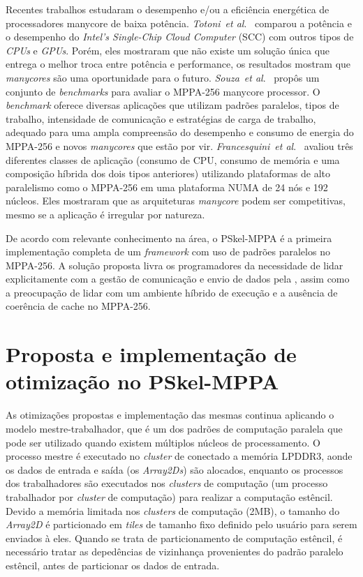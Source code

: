 \documentclass[a4paper,11pt]{article}
\newcommand{\etal}{\textit{et al}.\xspace}
\newcommand{\pskelmppa}{PSkel-MPPA\xspace}
\newcommand{\mppa}{MPPA-256\xspace}
\newcommand{\fw}{\textit{framework}\xspace}
\begin{document}
Recentes trabalhos estudaram o desempenho e/ou a eficiência energética de processadores manycore de baixa potência. \emph{Totoni}~\etal~\cite{SCCEnergy:2012} comparou a potência e o desempenho do \emph{Intel's Single-Chip Cloud Computer} (SCC) com outros tipos de \emph{CPUs} e \emph{GPUs}. Porém, eles mostraram que não existe um solução única que entrega o melhor troca entre potência e performance, os resultados mostram que \emph{manycores} são uma oportunidade para o futuro. \emph{Souza}~\etal~\cite{Castro-Souza-CCPE:2016} propôs um conjunto de \emph{benchmarks} para avaliar o \mppa manycore processor. O \emph{benchmark} oferece diversas aplicações que utilizam padrões paralelos, tipos de trabalho, intensidade de comunicação e estratégias de carga de trabalho, adequado para uma ampla compreensão do desempenho e consumo de energia do \mppa e novos \emph{manycores} que estão por vir. \emph{Francesquini}~\etal~\cite{Castro-IA3-JPDC:2014} avaliou três diferentes classes de aplicação (consumo de CPU, consumo de memória e uma composição híbrida dos dois tipos anteriores) utilizando plataformas de alto paralelismo como o \mppa em uma plataforma NUMA de 24 nós e 192 núcleos. Eles mostraram que as arquiteturas \emph{manycore} podem ser competitivas, mesmo se a aplicação é irregular por natureza.

De acordo com relevante conhecimento na área, o \pskelmppa é a primeira implementação completa de um \fw com uso de padrões paralelos no \mppa. A solução proposta livra os programadores da necessidade de lidar explicitamente com a gestão de comunicação e envio de dados pela \noc, assim como a preocupação de lidar com um ambiente híbrido de execução e a ausência de coerência de cache no \mppa.

\section{Proposta e implementação de otimização no PSkel-MPPA}
\label{sec:pskelMPPA}

As otimizações propostas e implementação das mesmas continua aplicando o modelo mestre-trabalhador, que é um dos padrões de computação paralela que pode ser utilizado quando existem múltiplos núcleos de processamento. O processo mestre é executado no \emph{cluster} de \io conectado a memória LPDDR3, aonde os dados de entrada e saída (os \emph{Array2Ds}) são alocados, enquanto os processos dos trabalhadores são executados nos \emph{clusters} de computação (um processo trabalhador por \emph{cluster} de computação) para realizar a computação estêncil. Devido a memória limitada nos \emph{clusters} de computação (2MB), o tamanho do \emph{Array2D} é particionado em \emph{tiles} de tamanho fixo definido pelo usuário para serem enviados à eles. Quando se trata de particionamento de computação estêncil, é necessário tratar as depedências de vizinhança provenientes do padrão paralelo estêncil, antes de particionar os dados de entrada.
\end{document}
